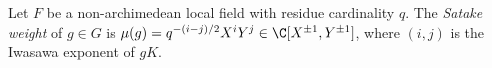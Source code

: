 Let $F$ be a non-archimedean local field with residue cardinality $q$. The \emph{Satake weight} of $g\in G$ is $\mu(g)=q^{-(i-j)/2}X^iY^j\in\C[X^{\pm1},Y^{\pm1}]$, where $(i,j)$ is the Iwasawa exponent of $gK$.
